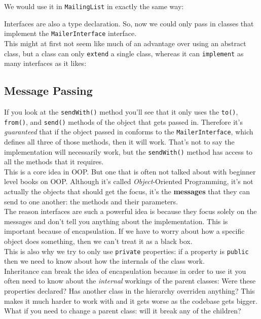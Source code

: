 We would use it in \texttt{MailingList} in exactly the same way:


Interfaces are also a type declaration. So, now we could only pass in classes that implement the \texttt{MailerInterface} interface.
\\

This might at first not seem like much of an advantage over using an abstract class, but a class can only \texttt{extend} a single class, whereas it can \texttt{implement} as many interfaces as it likes:



\subsection{Message Passing}

If you look at the \texttt{sendWith()} method you'll see that it only uses the \texttt{to()}, \texttt{from()}, and \texttt{send()} methods of the object that gets passed in. Therefore it's \textit{guaranteed} that if the object passed in conforms to the \texttt{MailerInterface}, which defines all three of those methods, then it will work. That's not to say the implementation will necessarily work, but the \texttt{sendWith()} method has access to all the methods that it requires.
\\

This is a core idea in OOP. But one that is often not talked about with beginner level books on OOP. Although it's called \textit{Object}-Oriented Programming, it's not actually the objects that should get the focus, it's the \textbf{messages} that they can send to one another: the methods and their parameters.
\\

The reason interfaces are such a powerful idea is because they focus solely on the messages and don't tell you anything about the implementation. This is important because of encapsulation. If we have to worry about how a specific object does something, then we can't treat it as a black box.
\\

This is also why we try to only use \texttt{private} properties: if a property is \texttt{public} then we need to know about how the internals of the class work.
\\

Inheritance can break the idea of encapsulation because in order to use it you often need to know about the \textit{internal} workings of the parent classes: Were these properties declared? Has another class in the hierarchy overriden anything? This makes it much harder to work with and it gets worse as the codebase gets bigger. What if you need to change a parent class: will it break any of the children?
\\


